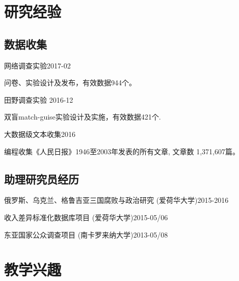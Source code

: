 \documentclass[10.5pt,]{article}
\providecommand{\tightlist}{%
  \setlength{\itemsep}{0pt}\setlength{\parskip}{0pt}}
\renewenvironment{itemize}{
  \begin{list}{}{
    \setlength{\leftmargin}{1.5em}
  }
}{
  \end{list}
}
\begin{document}
\section{研究经验}

\subsection{数据收集}

\begin{itemize}
\tightlist
\item
  网络调查实验\hfill 2017-02

  \begin{itemize}
  \tightlist
  \item
    \footnotesize 问卷、实验设计及发布，有效数据944个。
  \end{itemize}
\item
  田野调查实验 \hfill 2016-12

  \begin{itemize}
  \tightlist
  \item
    \footnotesize 双盲match-guise实验设计及实施，有效数据421个.
  \end{itemize}
\item
  大数据级文本收集\hfill 2016

  \begin{itemize}
  \tightlist
  \item
    \footnotesize 编程收集《人民日报》1946至2003年发表的所有文章, 文章数
    1,371,607篇。
  \end{itemize}
\end{itemize}

\subsection{助理研究员经历}

\begin{itemize}
\tightlist
\item
  俄罗斯、乌克兰、格鲁吉亚三国腐败与政治研究
  (爱荷华大学)\hfill 2015-2016
\item
  收入差异标准化数据库项目 (爱荷华大学)\hfill 2015-05/06
\item
  东亚国家公众调查项目 (南卡罗来纳大学)\hfill 2013-05/08
\end{itemize}

\section{教学兴趣}
\end{document}
